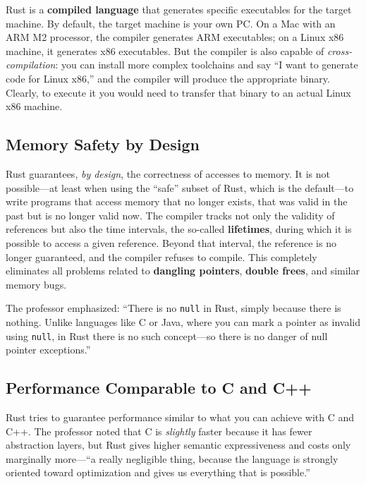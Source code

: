 Rust is a \textbf{compiled language} that generates specific executables for the target machine. By default, the target machine is your own PC. On a Mac with an ARM M2 processor, the compiler generates ARM executables; on a Linux x86 machine, it generates x86 executables. But the compiler is also capable of \emph{cross-compilation}: you can install more complex toolchains and say ``I want to generate code for Linux x86,'' and the compiler will produce the appropriate binary. Clearly, to execute it you would need to transfer that binary to an actual Linux x86 machine.

\subsection{Memory Safety by Design}

Rust guarantees, \emph{by design}, the correctness of accesses to memory. It is not possible---at least when using the ``safe'' subset of Rust, which is the default---to write programs that access memory that no longer exists, that was valid in the past but is no longer valid now. The compiler tracks not only the validity of references but also the time intervals, the so-called \textbf{lifetimes}, during which it is possible to access a given reference. Beyond that interval, the reference is no longer guaranteed, and the compiler refuses to compile. This completely eliminates all problems related to \textbf{dangling pointers}, \textbf{double frees}, and similar memory bugs.

\begin{insightbox}
The professor emphasized: ``There is no \texttt{null} in Rust, simply because there is nothing. Unlike languages like C or Java, where you can mark a pointer as invalid using \texttt{null}, in Rust there is no such concept---so there is no danger of null pointer exceptions.''
\end{insightbox}

\subsection{Performance Comparable to C and C++}

Rust tries to guarantee performance similar to what you can achieve with C and C++. The professor noted that C is \emph{slightly} faster because it has fewer abstraction layers, but Rust gives higher semantic expressiveness and costs only marginally more---``a really negligible thing, because the language is strongly oriented toward optimization and gives us everything that is possible.''

